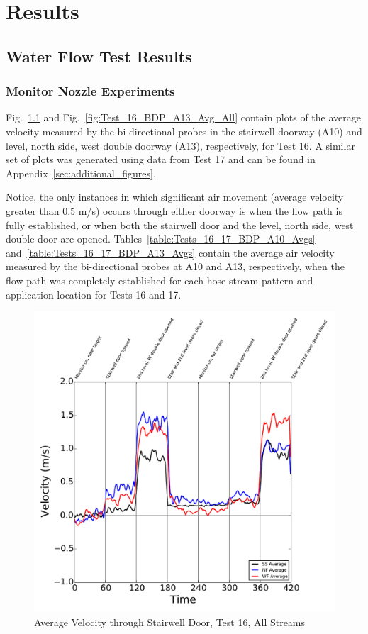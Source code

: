 \documentclass[12pt,oneside]{book}
\begin{document}
\chapter{Results}
\label{chap:Results}

\section{Water Flow Test Results}
\label{sec:Water_Flow_Test_Results}

\subsection{Monitor Nozzle Experiments}

Fig.~\ref{fig:Test_16_BDP_A10_Avg_All} and Fig.~\ref{fig:Test_16_BDP_A13_Avg_All} contain plots of the average velocity measured by the bi-directional probes in the stairwell doorway (A10) and  level, north side, west double doorway (A13), respectively, for Test 16. A similar set of plots was generated using data from Test 17 and can be found in Appendix~\ref{sec:additional_figures}.

Notice, the only instances in which significant air movement (average velocity greater than 0.5 m/s) occurs through either doorway is when the flow path is fully established, or when both the stairwell door and the  level, north side, west double door are opened. Tables~\ref{table:Tests_16_17_BDP_A10_Avgs} and~\ref{table:Tests_16_17_BDP_A13_Avgs} contain the average air velocity measured by the bi-directional probes at A10 and A13, respectively, when the flow path was completely established for each hose stream pattern and application location for Tests 16 and 17.

\begin{figure}[!ht]
\includegraphics[width=6in]{../../../Figures/Hose_Test_Figures/Test_16_West_063014_custom_BDP_A10_Avg}
\caption{Average Velocity through Stairwell Door, Test 16, All Streams}
\label{fig:Test_16_BDP_A10_Avg_All}
\end{figure}
\end{document}
